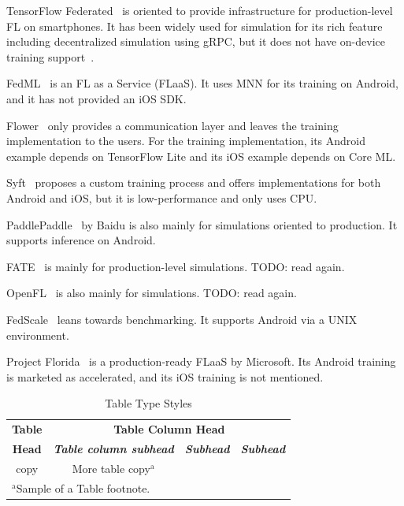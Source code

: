 \documentclass[conference]{IEEEtran}
\begin{document}
TensorFlow Federated~\cite{tff}
is oriented to
provide infrastructure for production-level FL on smartphones.
It has been widely used for simulation for its rich feature including
decentralized simulation using gRPC,
but it does not have on-device training support~\cite{kholod2020open}.

FedML~\cite{he2020fedml} is an FL as a Service (FLaaS).
It uses MNN for its training on Android,
and it has not provided an iOS SDK.

Flower~\cite{beutel2020flower,mathur2021ondevice}
only provides a communication layer and
leaves the training implementation to the users.
For the training implementation,
its Android example depends on TensorFlow Lite and
its iOS example depends on Core ML.

Syft~\cite{ryffel2018generic,Ziller2021,hall2021syft}
proposes a custom training process and
offers implementations for both Android and iOS,
but it is low-performance and only uses CPU.

PaddlePaddle~\cite{ma2019paddlepaddle} by Baidu is
also mainly for simulations oriented to production.
It supports inference on Android.

FATE~\cite{liu2021fate} is mainly for production-level simulations.
TODO: read again.

OpenFL~\cite{patrick2022openfl} is also mainly for simulations.
TODO: read again.

FedScale~\cite{lai2022fedscale} leans towards benchmarking.
It supports Android via a UNIX environment.

Project Florida~\cite{madrigal2023project}
is a production-ready FLaaS by Microsoft.
Its Android training is marketed as accelerated,
and its iOS training is not mentioned.


\begin{table}[htbp]
\caption{Table Type Styles}
\begin{center}
\begin{tabular}{|c|c|c|c|}
\hline
\textbf{Table}&\multicolumn{3}{|c|}{\textbf{Table Column Head}} \\
\cline{2-4} 
\textbf{Head} & \textbf{\textit{Table column subhead}}& \textbf{\textit{Subhead}}& \textbf{\textit{Subhead}} \\
\hline
copy& More table copy$^{\mathrm{a}}$& &  \\
\hline
\multicolumn{4}{l}{$^{\mathrm{a}}$Sample of a Table footnote.}
\end{tabular}
\label{tab1}
\end{center}
\end{table}
\end{document}
